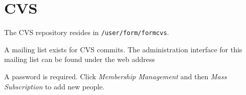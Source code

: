 \section{CVS}

The CVS repository resides in {\tt /user/form/formcvs}.


A mailing list exists for CVS commits. The administration interface for this mailing list can be
found under the web address


A password is required. Click {\it Membership Management} and then {\it Mass Subscription} to add
new people.

